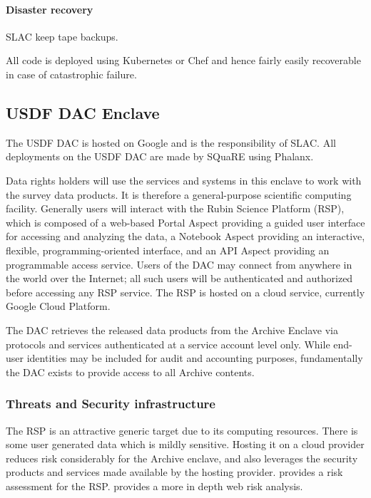 \paragraph{Disaster recovery}
SLAC keep tape backups.

All code is deployed using \gls{Kubernetes} or Chef and hence fairly easily recoverable in case of catastrophic failure.


\subsection{ \gls{USDF} \gls{DAC} Enclave}
The USDF \gls{DAC} is hosted on Google and  is the responsibility of SLAC.
All deployments on the USDF DAC are made by \gls{SQuaRE} using Phalanx.

Data rights holders will use the services and systems in this enclave to work with the survey data products.
It is therefore a general-purpose scientific computing facility. Generally users will interact with the Rubin \gls{Science Platform} (\gls{RSP}), which is composed of a web-based Portal Aspect providing a guided user interface for accessing and analyzing the data, a Notebook Aspect providing an interactive, flexible, programming-oriented interface, and an API Aspect providing an programmable access service.
Users of the DAC may connect from anywhere in the world over the Internet; all such users will be authenticated and authorized before accessing any \gls{RSP} service.
The \gls{RSP} is hosted on a \gls{cloud} service, currently  Google Cloud Platform.

The DAC retrieves the released data products from the \gls{Archive} \gls{Enclave} via protocols and services authenticated at a service account level only. While end-user identities may be included for audit and accounting purposes, fundamentally the DAC exists to provide access to all \gls{Archive} contents.

\subsubsection{ Threats and Security infrastructure}
The \gls{RSP} is  an attractive generic target due to its computing resources.
There is some user generated data which is mildly sensitive.
Hosting it on a cloud provider reduces risk considerably for the \gls{Archive} enclave, and also leverages the security products and services made available by the hosting provider.
 provides a risk assessment for the \gls{RSP}.
 provides a more in depth web risk analysis.

